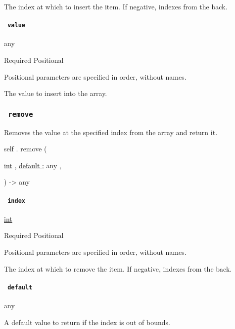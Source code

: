 The index at which to insert the item. If negative, indexes from the
back.

\paragraph{\texorpdfstring{\texttt{\ value\ }}{ value }}\label{definitions-insert-value}

{ any }

{Required} {{ Positional }}

\label{definitions-insert-value-positional-tooltip}
Positional parameters are specified in order, without names.

The value to insert into the array.

\subsubsection{\texorpdfstring{\texttt{\ remove\ }}{ remove }}\label{definitions-remove}

Removes the value at the specified index from the array and return it.

self { . } { remove } (

{ \href{/docs/reference/foundations/int/}{int} , } {
\hyperref[definitions-remove-parameters-default]{default :} { any } , }

) -\textgreater{} { any }

\paragraph{\texorpdfstring{\texttt{\ index\ }}{ index }}\label{definitions-remove-index}

\href{/docs/reference/foundations/int/}{int}

{Required} {{ Positional }}

\label{definitions-remove-index-positional-tooltip}
Positional parameters are specified in order, without names.

The index at which to remove the item. If negative, indexes from the
back.

\paragraph{\texorpdfstring{\texttt{\ default\ }}{ default }}\label{definitions-remove-default}

{ any }

A default value to return if the index is out of bounds.


